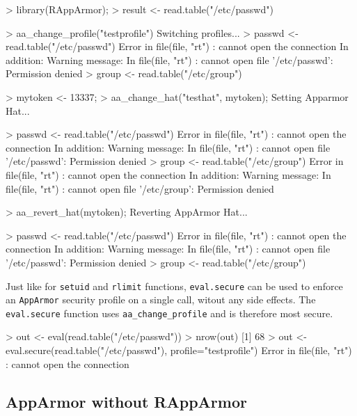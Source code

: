 \documentclass[article]{jss}
\newcommand{\AppArmor}{\texttt{AppArmor}\xspace}
\begin{document}
\begin{CodeChunk}
\begin{CodeInput}
> library(RAppArmor);
> result <- read.table("/etc/passwd")

> aa_change_profile("testprofile")
Switching profiles...
> passwd <- read.table("/etc/passwd")
Error in file(file, "rt") : cannot open the connection
In addition: Warning message:
In file(file, "rt") : cannot open file '/etc/passwd': Permission denied
> group <- read.table("/etc/group")

> mytoken <- 13337;
> aa_change_hat("testhat", mytoken);
Setting Apparmor Hat...

> passwd <- read.table("/etc/passwd")
Error in file(file, "rt") : cannot open the connection
In addition: Warning message:
In file(file, "rt") : cannot open file '/etc/passwd': Permission denied
> group <- read.table("/etc/group")
Error in file(file, "rt") : cannot open the connection
In addition: Warning message:
In file(file, "rt") : cannot open file '/etc/group': Permission denied

> aa_revert_hat(mytoken);
Reverting AppArmor Hat...

> passwd <- read.table("/etc/passwd")
Error in file(file, "rt") : cannot open the connection
In addition: Warning message:
In file(file, "rt") : cannot open file '/etc/passwd': Permission denied
> group <- read.table("/etc/group")
\end{CodeInput}
\end{CodeChunk}

Just like for \texttt{setuid} and \texttt{rlimit} functions,
\texttt{eval.secure} can be used to enforce an \AppArmor security profile on a
single call, witout any side effects. The \texttt{eval.secure} function uses
\texttt{aa\_change\_profile} and is therefore most secure.

\begin{CodeChunk}
\begin{CodeInput}
> out <- eval(read.table("/etc/passwd"))
> nrow(out)
[1] 68
> out <- eval.secure(read.table("/etc/passwd"), profile="testprofile")
Error in file(file, "rt") : cannot open the connection
\end{CodeInput}
\end{CodeChunk}

\subsection{AppArmor without RAppArmor}
\label{usr.bin.r}
\end{document}
